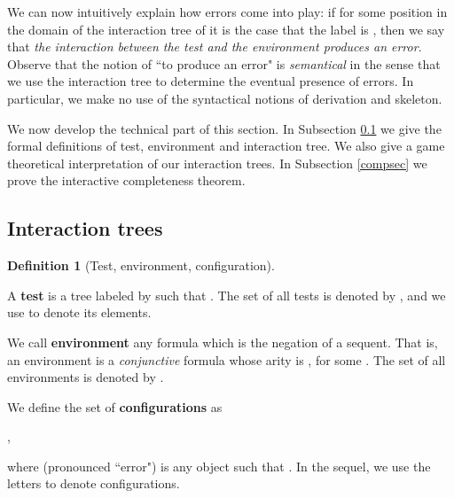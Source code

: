 \documentclass[copyright,creativecommons]{eptcs}
\theoremstyle{definition}
\newtheorem{Definition}[theorem]{Definition}
\newcommand{\squishlist}{
 \begin{list}{}
  { \setlength{\itemsep}{0pt}
     \setlength{\parsep}{3pt}
     \setlength{\topsep}{3pt}
     \setlength{\partopsep}{0pt}
     \setlength{\leftmargin}{1em}
     \setlength{\labelwidth}{1.5em}
     \setlength{\labelsep}{0.5em} } }
\newcommand{\squishend}{
  \end{list}  }
\newcommand{\sqi}{
 \begin{list}{}
  { \setlength{\itemsep}{0pt}
     \setlength{\parsep}{3pt}
     \setlength{\topsep}{3pt}
     \setlength{\partopsep}{0pt}
     \setlength{\leftmargin}{1.4em}
     \setlength{\labelwidth}{1.5em}
     \setlength{\labelsep}{0.3em} } }
\newcommand{\sqe}{
  \end{list}  }
\begin{document}
\noindent We can now intuitively explain
how errors
come into play:
if for some position  in the domain of the interaction tree of  it is the case that the label is
, then we  say that \emph{the interaction between the test  and the environment  produces an error}.
 Observe that the notion of ``to produce an error" is
\emph{semantical} in the sense that we use the interaction
tree to determine the eventual presence of errors. In particular, we make no use of  the syntactical notions of derivation and skeleton. \\









\vspace{-0.3cm}


We now develop the technical part of this section.
In Subsection \ref{sec trees} we give the formal definitions
of test, environment and interaction tree. We also give
a game theoretical interpretation  of our   interaction trees.
 In Subsection \ref{compsec} we  prove the interactive completeness theorem.




\subsection{Interaction trees} \label{sec trees}


\begin{Definition}[Test, environment, configuration]
\label{envir} \hfill
\sqi
\item[(1)] A  \textbf{test} is a tree   labeled by  such that . The set of all tests is denoted by , and
we use   to denote its elements.
\item[(2)] We call \textbf{environment}   any formula
which is the negation of a sequent. That is, an environment
is a  \emph{conjunctive} formula
whose arity is , for some
.
The set of  all environments is denoted by .
\item[(3)] We define the set  of  \textbf{configurations} as
\squishlist
\item[]{ \centering
,
\par}
\squishend
\noindent where  (pronounced ``error")    is any object such that  .
In the sequel, we use the letters  to denote configurations.\hfill
\sqe

\end{Definition}
\end{document}
